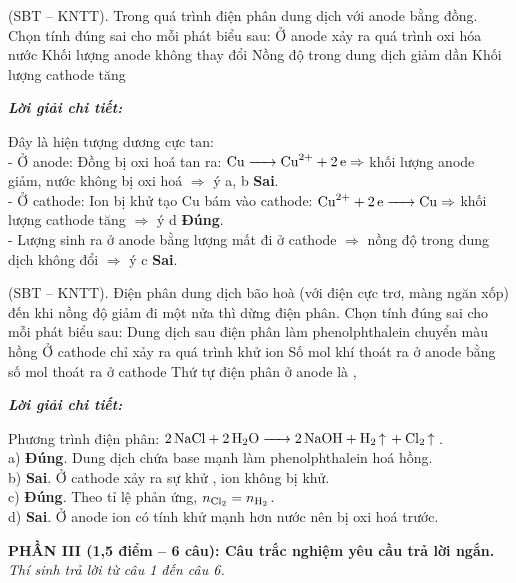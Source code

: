 \documentclass[11pt,a4paper]{article}
\def\loigiai#1{
\par\begingroup\color{blue!80!black}\small
\noindent\textbf{\textit{Lời giải chi tiết:}}\par
#1\par\endgroup}
\begin{document}
\begin{ex}
(SBT – KNTT). Trong quá trình điện phân dung dịch  với anode bằng đồng. Chọn tính đúng sai cho mỗi phát biểu sau:
\choiceTF
{Ở anode xảy ra quá trình oxi hóa nước}
{Khối lượng anode không thay đổi}
{Nồng độ  trong dung dịch giảm dần}
{\True Khối lượng cathode tăng}
\loigiai{
Đây là hiện tượng dương cực tan:\\
- Ở anode: Đồng bị oxi hoá tan ra: $\ce{Cu -> Cu^2+ + 2e} \Rightarrow$ khối lượng anode giảm, nước không bị oxi hoá $\Rightarrow$ ý a, b \textbf{Sai}.\\
- Ở cathode: Ion \ce{Cu^2+} bị khử tạo Cu bám vào cathode: $\ce{Cu^2+ + 2e -> Cu} \Rightarrow$ khối lượng cathode tăng $\Rightarrow$ ý d \textbf{Đúng}.\\
- Lượng \ce{Cu^2+} sinh ra ở anode bằng lượng \ce{Cu^2+} mất đi ở cathode $\Rightarrow$ nồng độ \ce{CuSO4} trong dung dịch không đổi $\Rightarrow$ ý c \textbf{Sai}.}
\end{ex}

\begin{ex}
(SBT – KNTT). Điện phân dung dịch  bão hoà (với điện cực trơ, màng ngăn xốp) đến khi nồng độ  giảm đi một nửa thì dừng điện phân. Chọn tính đúng sai cho mỗi phát biểu sau:
\choiceTF
{\True Dung dịch sau điện phân làm phenolphthalein chuyển màu hồng}
{Ở cathode chỉ xảy ra quá trình khử ion }
{\True Số mol khí  thoát ra ở anode bằng số mol  thoát ra ở cathode}
{Thứ tự điện phân ở anode là , }
\loigiai{
Phương trình điện phân: $\ce{2NaCl + 2H2O -> 2NaOH + H2 ^ + Cl2 ^}$.\\
a) \textbf{Đúng}. Dung dịch chứa base mạnh \ce{NaOH} làm phenolphthalein hoá hồng.\\
b) \textbf{Sai}. Ở cathode xảy ra sự khử \ce{H2O}, ion \ce{Na+} không bị khử.\\
c) \textbf{Đúng}. Theo tỉ lệ phản ứng, $n_{\ce{Cl2}} = n_{\ce{H2}}$.\\
d) \textbf{Sai}. Ở anode ion \ce{Cl-} có tính khử mạnh hơn nước nên bị oxi hoá trước.}
\end{ex}



\noindent
\textbf{PHẦN III (1,5 điểm -- 6 câu): Câu trắc nghiệm yêu cầu trả lời ngắn.}\\
\textit{Thí sinh trả lời từ câu 1 đến câu 6.}

\setcounter{ex}{0}
\end{document}
